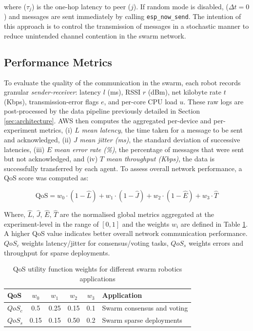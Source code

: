 \documentclass[conference]{IEEEtran}
\begin{document}
where ($\tau_{j}$) is the one-hop latency to peer ($j$). If random mode is disabled, ($\Delta t = 0$) and messages are sent immediately by calling \texttt{esp\_now\_send}. The intention of this approach is to control the transmission of messages in a stochastic manner to reduce unintended channel contention in the swarm network.

\subsection{Performance Metrics}\label{sec:evaluation-metrics}

To evaluate the quality of the communication in the swarm, each robot records granular \emph{sender-receiver}: latency $l$ (ms), RSSI $r$ (dBm), net kilobyte rate $t$ (Kbps), transmission-error flags $e$, and per-core CPU load $u$. These raw logs are post-processed by the data pipeline previously detailed in Section \ref{sec:architecture}. AWS then computes the aggregated per-device and per-experiment metrics, (i) $L$ \emph{mean latency}, the time taken for a message to be sent and acknowledged, (ii) $J$ \emph{mean jitter (ms)}, the standard deviation of successive latencies, (iii) $E$ \emph{mean error rate (\%)}, the percentage of messages that were sent but not acknowledged, and (iv) $T$ \emph{mean throughput (Kbps)}, the data is successfully transferred by each agent. To assess overall network performance, a QoS score was computed as:

\begin{equation}
\mathrm{QoS} = w_0 \cdot (1 - \hat{L}) + w_1 \cdot (1 - \hat{J}) + w_2 \cdot (1 - \hat{E}) + w_3 \cdot \hat{T}
\end{equation}

Where, $\hat{L}$, $\hat{J}$, $\hat{E}$, $\hat{T}$ are the normalised global metrics aggregated at the experiment-level in the range of $[0,1]$ and the weights $w_i$ are defined in Table \ref{tab:qos}. A higher QoS value indicates better overall network communication performance. $QoS_c$ weights latency/jitter for consensus/voting tasks, $QoS_s$ weights errors and throughput for sparse deployments. %

\begin{table}[H]
\centering
\caption{QoS utility function weights for different swarm robotics applications}
\label{tab:qos}
  \begin{tabular}{@{} lcccc p{3.5cm} @{}}
  \toprule
  \textbf{QoS} & \textbf{$w_0$} & \textbf{$w_1$} & \textbf{$w_2$} & \textbf{$w_3$} & \textbf{Application} \\
  \midrule
  $QoS_c$      & 0.5  & 0.25   & 0.15   & 0.1     & Swarm consensus and voting     \\
  $QoS_s$      & 0.15 & 0.15   & 0.50   & 0.2     & Swarm sparse deployments       \\
  \bottomrule
  \end{tabular}
\end{table}
\end{document}
